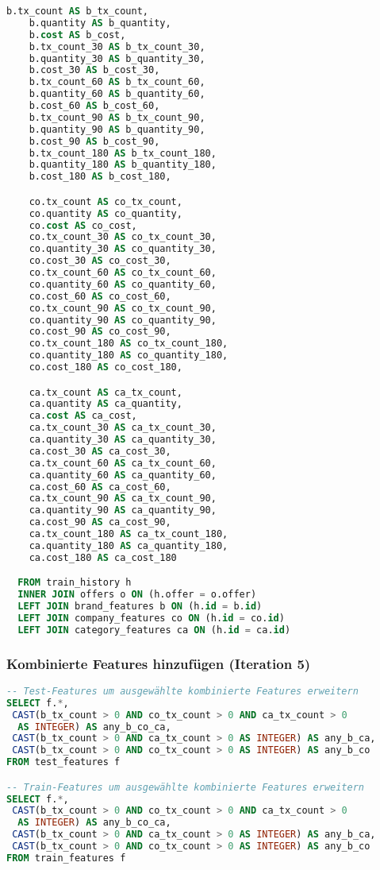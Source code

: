 \begin{lstlisting}[language=SQL]
    b.tx_count AS b_tx_count,
    b.quantity AS b_quantity,
    b.cost AS b_cost,
    b.tx_count_30 AS b_tx_count_30,
    b.quantity_30 AS b_quantity_30,
    b.cost_30 AS b_cost_30,
    b.tx_count_60 AS b_tx_count_60,
    b.quantity_60 AS b_quantity_60,
    b.cost_60 AS b_cost_60,
    b.tx_count_90 AS b_tx_count_90,
    b.quantity_90 AS b_quantity_90,
    b.cost_90 AS b_cost_90,
    b.tx_count_180 AS b_tx_count_180,
    b.quantity_180 AS b_quantity_180,
    b.cost_180 AS b_cost_180,

    co.tx_count AS co_tx_count,
    co.quantity AS co_quantity,
    co.cost AS co_cost,
    co.tx_count_30 AS co_tx_count_30,
    co.quantity_30 AS co_quantity_30,
    co.cost_30 AS co_cost_30,
    co.tx_count_60 AS co_tx_count_60,
    co.quantity_60 AS co_quantity_60,
    co.cost_60 AS co_cost_60,
    co.tx_count_90 AS co_tx_count_90,
    co.quantity_90 AS co_quantity_90,
    co.cost_90 AS co_cost_90,
    co.tx_count_180 AS co_tx_count_180, 
    co.quantity_180 AS co_quantity_180,
    co.cost_180 AS co_cost_180,

    ca.tx_count AS ca_tx_count,
    ca.quantity AS ca_quantity,
    ca.cost AS ca_cost,
    ca.tx_count_30 AS ca_tx_count_30,
    ca.quantity_30 AS ca_quantity_30,
    ca.cost_30 AS ca_cost_30,
    ca.tx_count_60 AS ca_tx_count_60,
    ca.quantity_60 AS ca_quantity_60,
    ca.cost_60 AS ca_cost_60,
    ca.tx_count_90 AS ca_tx_count_90,
    ca.quantity_90 AS ca_quantity_90,
    ca.cost_90 AS ca_cost_90,
    ca.tx_count_180 AS ca_tx_count_180,
    ca.quantity_180 AS ca_quantity_180,
    ca.cost_180 AS ca_cost_180

  FROM train_history h
  INNER JOIN offers o ON (h.offer = o.offer)
  LEFT JOIN brand_features b ON (h.id = b.id)
  LEFT JOIN company_features co ON (h.id = co.id)
  LEFT JOIN category_features ca ON (h.id = ca.id)
\end{lstlisting}

\subsubsection{Kombinierte Features hinzufügen (Iteration 5)}

\begin{lstlisting}[language=SQL]
-- Test-Features um ausgewählte kombinierte Features erweitern
SELECT f.*, 
 CAST(b_tx_count > 0 AND co_tx_count > 0 AND ca_tx_count > 0 
  AS INTEGER) AS any_b_co_ca,
 CAST(b_tx_count > 0 AND ca_tx_count > 0 AS INTEGER) AS any_b_ca,
 CAST(b_tx_count > 0 AND co_tx_count > 0 AS INTEGER) AS any_b_co
FROM test_features f

-- Train-Features um ausgewählte kombinierte Features erweitern
SELECT f.*, 
 CAST(b_tx_count > 0 AND co_tx_count > 0 AND ca_tx_count > 0 
  AS INTEGER) AS any_b_co_ca,
 CAST(b_tx_count > 0 AND ca_tx_count > 0 AS INTEGER) AS any_b_ca,
 CAST(b_tx_count > 0 AND co_tx_count > 0 AS INTEGER) AS any_b_co
FROM train_features f
\end{lstlisting}

